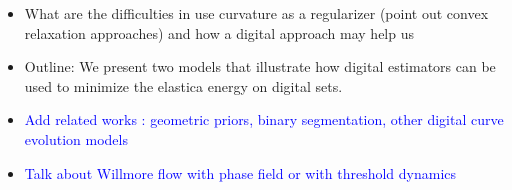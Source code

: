 \documentclass[runningheads]{llncs}
\newcommand{\todo}[1]{{\textcolor{blue}{#1}}}
\begin{document}

\begin{itemize}
  
  
\item{What are the difficulties in use curvature as a regularizer (point out convex relaxation approaches) and how a digital approach may help us }
\item{Outline: We present two models that illustrate how digital estimators can be used to minimize the elastica energy on digital sets.  }
\item{\todo{Add related works : geometric priors, binary segmentation, other digital curve evolution models}}
\item{\todo{Talk about Willmore flow with phase field or with threshold dynamics}}
  
  
  

\end{itemize}
\end{document}
